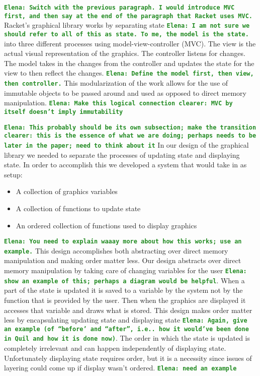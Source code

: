 \documentclass[12pt]{article}
\newcommand{\comment}[1]{{\bf \tt  {#1}}}
\newcommand{\emcomment}[1]{\textcolor{ForestGreen}{\comment{Elena: {#1}}}}
\begin{document}
\emcomment{Switch with the previous paragraph. I would introduce MVC first, and then say at the end of the paragraph that Racket uses MVC.}
Racket's graphical library works by separating state \emcomment{I am not sure we should refer to all of this as state. To me, the model is the state.} into three different processes using model-view-controller (MVC). The view is the actual visual representation of the graphics. The controller listens for changes. The model takes in the changes from the controller and updates the state for the view to then reflect the changes. \emcomment{Define the model first, then view, then controller.} This modularization of the work allows for the use of immutable objects to be passed around and used as opposed to direct memory manipulation. \emcomment{Make this logical connection clearer: MVC by itself doesn't imply immutability}

\emcomment{This probably should be its own subsection; make the transition clearer: this is the essence of what we are doing; perhaps needs to be later in the paper; need to think about it}
In our design of the graphical library we needed to separate the processes of updating state and displaying state. In order to accomplish this we developed a system that would take in as setup: 
\begin{itemize}
	\item A collection of graphics variables 
	\item A collection of functions to update state
	\item An ordered collection of functions used to display graphics 
\end{itemize}
\emcomment{You need to explain waaay more about how this works; use an example.}
This design accomplishes both abstracting over direct memory manipulation and making order matter less. Our design abstracts over direct memory manipulation by taking care of changing variables for the user \emcomment{show an example of this; perhaps a diagram would be helpful}. When a part of the state is updated it is saved to a variable by the system not by the function that is provided by the user. Then when the graphics are displayed it accesses that variable and draws what is stored. This design makes order matter less by encapsulating updating state and displaying state \emcomment{Again, give an example (of ``before' and ``after'', i.e.. how it would've been done in Quil and how it is done now)}. The order in which the state is updated is completely irrelevant and can happen independently of displaying state. Unfortunately displaying state requires order, but it is a necessity since issues of layering could come up if display wasn't ordered.
\emcomment{need an example}
\end{document}

